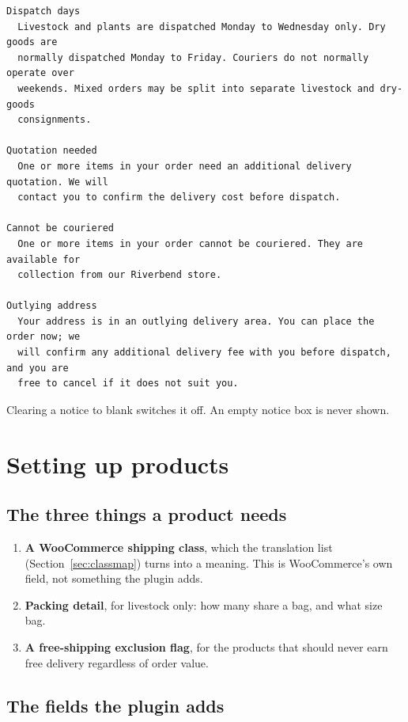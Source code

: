 \documentclass[11pt,a4paper,oneside]{report}
\begin{document}
\begin{lstlisting}[basicstyle=\ttfamily\scriptsize]
Dispatch days
  Livestock and plants are dispatched Monday to Wednesday only. Dry goods are
  normally dispatched Monday to Friday. Couriers do not normally operate over
  weekends. Mixed orders may be split into separate livestock and dry-goods
  consignments.

Quotation needed
  One or more items in your order need an additional delivery quotation. We will
  contact you to confirm the delivery cost before dispatch.

Cannot be couriered
  One or more items in your order cannot be couriered. They are available for
  collection from our Riverbend store.

Outlying address
  Your address is in an outlying delivery area. You can place the order now; we
  will confirm any additional delivery fee with you before dispatch, and you are
  free to cancel if it does not suit you.
\end{lstlisting}

Clearing a notice to blank switches it off. An empty notice box is never shown.

\chapter{Setting up products}

\section{The three things a product needs}

\begin{enumerate}
  \item \textbf{A WooCommerce shipping class}, which the translation list
        (Section~\ref{sec:classmap}) turns into a meaning. This is WooCommerce's own
        field, not something the plugin adds.
  \item \textbf{Packing detail}, for livestock only: how many share a bag, and what size
        bag.
  \item \textbf{A free-shipping exclusion flag}, for the products that should never earn
        free delivery regardless of order value.
\end{enumerate}

\section{The fields the plugin adds}
\end{document}
